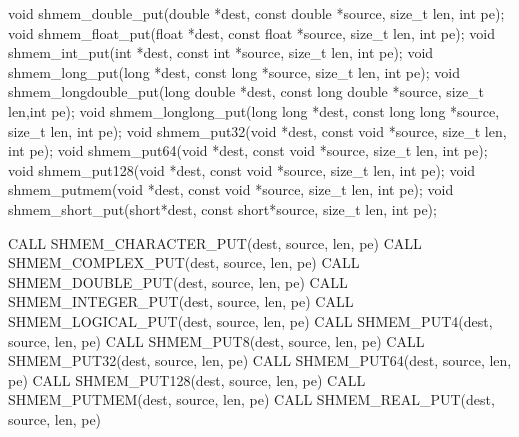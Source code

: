 
\begin{apidefinition}

\begin{Csynopsis}
void shmem_double_put(double *dest, const double *source, size_t len, int pe);
void shmem_float_put(float *dest, const float *source, size_t len, int pe);
void shmem_int_put(int *dest, const int *source, size_t len, int pe);
void shmem_long_put(long *dest, const long *source, size_t len, int pe);
void shmem_longdouble_put(long double *dest, const long double *source, size_t len,int pe);
void shmem_longlong_put(long long *dest, const long long *source, size_t len, int pe);
void shmem_put32(void *dest, const void *source, size_t len, int pe);
void shmem_put64(void *dest, const void *source, size_t len, int pe);
void shmem_put128(void *dest, const void *source, size_t len, int pe);
void shmem_putmem(void *dest, const void *source, size_t len, int pe);
void shmem_short_put(short*dest, const short*source, size_t len, int pe);
\end{Csynopsis}

\begin{Fsynopsis}
CALL SHMEM_CHARACTER_PUT(dest, source, len, pe)
CALL SHMEM_COMPLEX_PUT(dest, source, len, pe)
CALL SHMEM_DOUBLE_PUT(dest, source, len, pe)
CALL SHMEM_INTEGER_PUT(dest, source, len, pe)
CALL SHMEM_LOGICAL_PUT(dest, source, len, pe)
CALL SHMEM_PUT4(dest, source, len, pe)
CALL SHMEM_PUT8(dest, source, len, pe)
CALL SHMEM_PUT32(dest, source, len, pe)
CALL SHMEM_PUT64(dest, source, len, pe)
CALL SHMEM_PUT128(dest, source, len, pe)
CALL SHMEM_PUTMEM(dest, source, len, pe)
CALL SHMEM_REAL_PUT(dest, source, len, pe)
\end{Fsynopsis}

\begin{apiarguments}
\end{apiarguments}


\end{apidefinition}
